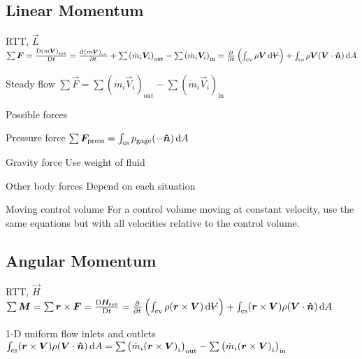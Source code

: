 \documentclass{article}
\begin{document}
\subsection{Linear Momentum}
\begin{description*}
\item[RTT, $\vec{L}$]
  \(\sum{\vec{F}}
  = \frac{\Dif{(m\vec{V})}_\mathrm{sys}}{\Dif t}
  = \pd{{(m\vec{V})}_\mathrm{cv}}{t}
  + \sum{\left(\dot{m}_i\vec{V}_i\right)}_\mathrm{out}
  - \sum{\left(\dot{m}_i\vec{V}_i\right)}_\mathrm{in}
  = \pd{}{t}\left(\int_\mathrm{cv}\rho\vec{V}\dif{\volsym}\right)
  + \int_\mathrm{cs}\rho\vec{V}(\vec{V}\cdot\uvec{n})\dif{A}\)
\item[Steady flow]
  \(\sum{\vec{F}}
  = \sum{\left(\dot{m}_i\vec{V}_i\right)}_\mathrm{out}
  - \sum{\left(\dot{m}_i\vec{V}_i\right)}_\mathrm{in}\)
\item[Possible forces]~
  \begin{description*}
    \item[Pressure force]
      \(\sum\vec{F}_\mathrm{press} = \int_\mathrm{cs}p_\mathrm{gage}(-\uvec{n})\dif{A}\)
    \item[Gravity force] Use weight of fluid
    \item[Other body forces] Depend on each situation
  \end{description*}
\item[Moving control volume] For a control volume moving at constant velocity, use the same
  equations but with all velocities relative to the control volume.
\end{description*}

\subsection{Angular Momentum}
\begin{description*}
\item[RTT, $\vec{H}$]
  \(\sum\vec{M} = \sum\vec{r}\times\vec{F}
  = \frac{\Dif \vec{H}_\mathrm{sys}}{\Dif t}
  = \pd{}{t}\left(\int_\mathrm{cv}\rho(\vec{r}\times\vec{V})\dif{\volsym}\right)
  + \int_\mathrm{cs}(\vec{r}\times\vec{V})\rho(\vec{V}\cdot\uvec{n})\dif{A}\)
\item[1-D uniform flow inlets and outlets]
  \(\int_\mathrm{cs}(\vec{r}\times\vec{V})\rho(\vec{V}\cdot\uvec{n})\dif{A}
  = \sum{\left(\dot{m}_i{(\vec{r}\times\vec{V})}_i\right)}_\mathrm{out}
  - \sum{\left(\dot{m}_i{(\vec{r}\times\vec{V})}_i\right)}_\mathrm{in}\)
\end{description*}
\end{document}

